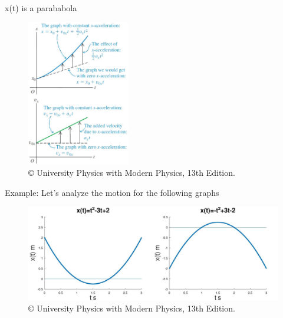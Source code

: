 \documentclass[]{beamer}
\begin{document}
 \begin{frame}
  x(t) is a parababola
   \vspace{3mm}

   \begin{figure}[h!]
 
      \includegraphics[width=0.4\textwidth]{images/18.jpg}
      \caption{ {\tiny © University Physics 
      with Modern Physics, 13th Edition.} }
    \end{figure}


 \end{frame}



  \begin{frame}
 Example: Let's analyze the motion for the following graphs  
    \vspace{3mm}
 
    \begin{figure}[h!]
  
       \includegraphics[width=1.\textwidth]{images/19.jpg}
       \caption{ {\tiny © University Physics 
       with Modern Physics, 13th Edition.} }
     \end{figure}
 
 
  \end{frame}
 
\end{document}
